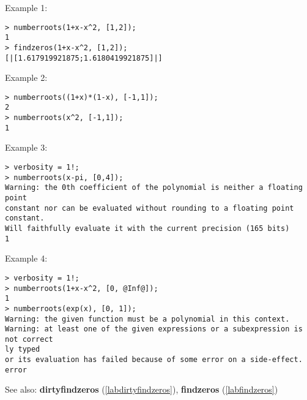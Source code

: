 \noindent Example 1: 
\begin{center}\begin{minipage}{15cm}\begin{Verbatim}[frame=single]
> numberroots(1+x-x^2, [1,2]);
1
> findzeros(1+x-x^2, [1,2]);
[|[1.617919921875;1.6180419921875]|]
\end{Verbatim}
\end{minipage}\end{center}
\noindent Example 2: 
\begin{center}\begin{minipage}{15cm}\begin{Verbatim}[frame=single]
> numberroots((1+x)*(1-x), [-1,1]);
2
> numberroots(x^2, [-1,1]);
1
\end{Verbatim}
\end{minipage}\end{center}
\noindent Example 3: 
\begin{center}\begin{minipage}{15cm}\begin{Verbatim}[frame=single]
> verbosity = 1!;
> numberroots(x-pi, [0,4]);
Warning: the 0th coefficient of the polynomial is neither a floating point
constant nor can be evaluated without rounding to a floating point constant.
Will faithfully evaluate it with the current precision (165 bits) 
1
\end{Verbatim}
\end{minipage}\end{center}
\noindent Example 4: 
\begin{center}\begin{minipage}{15cm}\begin{Verbatim}[frame=single]
> verbosity = 1!;
> numberroots(1+x-x^2, [0, @Inf@]);
1
> numberroots(exp(x), [0, 1]);
Warning: the given function must be a polynomial in this context.
Warning: at least one of the given expressions or a subexpression is not correct
ly typed
or its evaluation has failed because of some error on a side-effect.
error
\end{Verbatim}
\end{minipage}\end{center}
See also: \textbf{dirtyfindzeros} (\ref{labdirtyfindzeros}), \textbf{findzeros} (\ref{labfindzeros})

